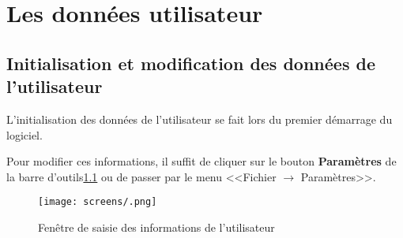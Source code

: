 \chapter{Les données utilisateur}
\section{Initialisation et modification des données de l'utilisateur}
L'initialisation des données de l'utilisateur se fait lors du premier démarrage du logiciel.

Pour modifier ces informations, il suffit de cliquer sur le bouton \textbf{Paramètres} de la barre d'outils\ref{fig:modifierUtilisateur} ou de passer par le menu <<Fichier $\rightarrow$ Paramètres>>. 

\begin{figure}[H]
	\centering
	\texttt{[image: screens/.png]}
	\caption{Fenêtre de saisie des informations de l'utilisateur}
	\label{fig:modifierUtilisateur}
\end{figure}